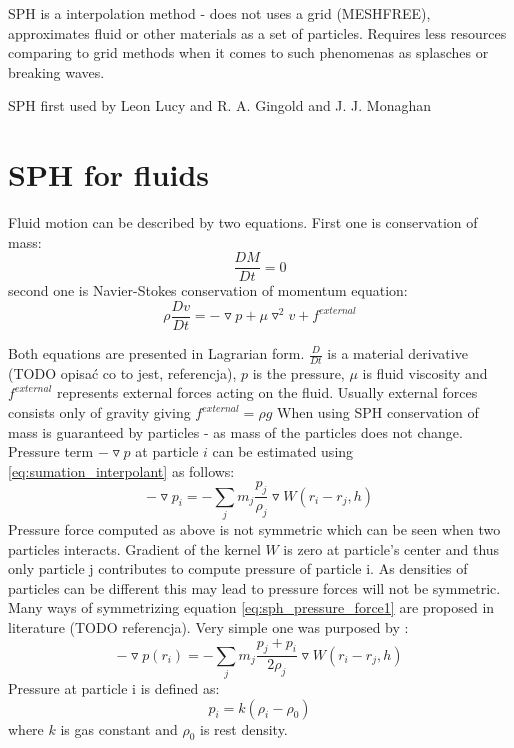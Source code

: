 SPH is a interpolation method - does not uses a grid (MESHFREE), approximates fluid or other materials as a set of particles. Requires less resources comparing to grid methods when it comes to such phenomenas as splasches or breaking waves. 

SPH first used by Leon Lucy and R. A. Gingold and J. J. Monaghan

\section{SPH for fluids}
Fluid motion can be described by two equations. First one is conservation of mass:
\begin{equation}
\label{eq:mass_conservation}
\frac{DM}{Dt} = 0
\end{equation}
second one is Navier-Stokes conservation of momentum equation:
\begin{equation}
\label{eq:momentum_conservation}
\rho \frac{Dv}{Dt} = -\triangledown p + \mu \triangledown^2v + f^{external}
\end{equation}

Both equations are presented in Lagrarian form. $\frac{D}{Dt}$ is a material derivative (TODO opisać co to jest, referencja), $p$ is the pressure, $\mu$ is fluid viscosity and $f^{external}$ represents external forces acting on the fluid. Usually external forces consists only of gravity giving $f^{external} = \rho g$
When using SPH conservation of mass is guaranteed by particles - as mass of the particles does not change. 
Pressure term $-\triangledown p$  at particle $i$ can be estimated using \ref{eq:sumation_interpolant} as follows:
\begin{equation}
\label{eq:sph_pressure_force1}
-\triangledown p_i = -\sum_{j}m_j \frac{p_j}{\rho_j}\triangledown W(r_i - r_j, h) 
\end{equation}
Pressure force computed as above is not symmetric which can be seen when two particles interacts. Gradient of the kernel $W$ is zero at particle's center and thus only particle j contributes to compute pressure of particle i. As densities of particles can be different this may lead to pressure forces will not be symmetric. Many ways of symmetrizing equation \ref{eq:sph_pressure_force1} are proposed in literature (TODO referencja). Very simple one was purposed by \cite{Muller2003}:
\begin{equation}
\label{eq:sph_pressure_force_muller}
-\triangledown p(r_i) = -\sum_{j}m_j \frac{p_j + p_i}{2\rho_j}\triangledown W(r_i - r_j, h) 
\end{equation}
Pressure at particle i is defined as:
\begin{equation}
\label{eq:pressure}
p_i = k(\rho_i - \rho_0)
\end{equation}
where $k$ is gas constant and $\rho_0$ is rest density.

